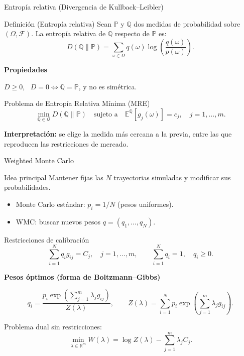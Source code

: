 \documentclass[8pt]{beamer}
\begin{document}
\begin{frame}{Entropía relativa (Divergencia de Kullback--Leibler)}
    \begin{block}{Definición (Entropía relativa)}
        Sean $\mathbb{P}$ y $\mathbb{Q}$ dos medidas de probabilidad sobre $(\Omega,\mathcal{F})$. La entropía relativa de $\mathbb{Q}$ respecto de $\mathbb{P}$ es:
        \[
            D(\mathbb{Q}\|\mathbb{P}) = \sum_{\omega\in\Omega} q(\omega)\log\left(\frac{q(\omega)}{p(\omega)}\right).
        \]
    \end{block}
    \pause
    
    \textbf{Propiedades}

$D \geq 0$, \, $D = 0 \Leftrightarrow \mathbb{Q} = \mathbb{P}$, y no es simétrica.

    \pause
    
    \begin{alertblock}{Problema de Entropía Relativa Mínima (MRE)}
        \[
            \min_{\mathbb{Q}\in\mathcal{Q}} D(\mathbb{Q}\|\mathbb{P})
            \quad \text{sujeto a} \quad
            \mathbb{E}^{\mathbb Q}[g_j(\omega)] = c_j, \quad j=1,\ldots,m.
        \]
    \end{alertblock}
    \pause
    
    \begin{center}
    \textbf{Interpretación:} se elige la medida más cercana a la previa, entre las que reproducen las restricciones de mercado.
    \end{center}
\end{frame}

\begin{frame}{Weighted Monte Carlo}
    \begin{block}{Idea principal}
    Mantener fijas las $N$ trayectorias simuladas y modificar sus probabilidades.
    \end{block}
    \pause
    
    \begin{itemize}
        \item Monte Carlo estándar: $p_i = 1/N$ (pesos uniformes).
        \item WMC: buscar nuevos pesos $q = (q_1,\ldots,q_N)$.
    \end{itemize}
    \pause
    
    \begin{block}{Restricciones de calibración}
        \[
            \sum_{i=1}^N q_i g_{ij} = C_j, \quad j=1,\ldots,m, \qquad
            \sum_{i=1}^N q_i = 1, \quad q_i \geq 0.
        \]
    \end{block}
    \pause
    
    \textbf{Pesos óptimos (forma de Boltzmann--Gibbs)}

\[
            q_i = \frac{p_i\exp\left(\sum_{j=1}^m \lambda_j g_{ij}\right)}{Z(\lambda)}, \qquad
            Z(\lambda) = \sum_{i=1}^N p_i\exp\left(\sum_{j=1}^m \lambda_j g_{ij}\right).
        \]

    \pause
    
    Problema dual sin restricciones:
    \[
        \min_{\lambda\in\mathbb{R}^m} W(\lambda) = \log Z(\lambda) - \sum_{j=1}^m \lambda_j C_j.
    \]
\end{frame}
\end{document}
